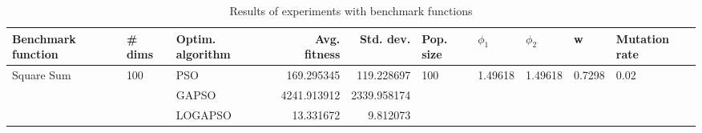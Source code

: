 \begin{table}
\centering
\caption{Results of experiments with benchmark functions}
\begin{tabular}{lllrrlllll}
\toprule
         Benchmark function &              \# dims & Optim. algorithm &  Avg. fitness &   Std. dev. &            Pop. size &               $\phi_{1}$ &               $\phi_{2}$ &                       w &         Mutation rate \\
\midrule
\multirow{3}{*}{Square Sum} & \multirow{3}{*}{100} &              PSO &    169.295345 &  119.228697 & \multirow{3}{*}{100} & \multirow{3}{*}{1.49618} & \multirow{3}{*}{1.49618} & \multirow{3}{*}{0.7298} & \multirow{3}{*}{0.02} \\
                            &                      &            GAPSO &   4241.913912 & 2339.958174 &                      &                          &                          &                         &                       \\
                            &                      &          LOGAPSO &     13.331672 &    9.812073 &                      &                          &                          &                         &                       \\
\bottomrule
\end{tabular}
\end{table}
